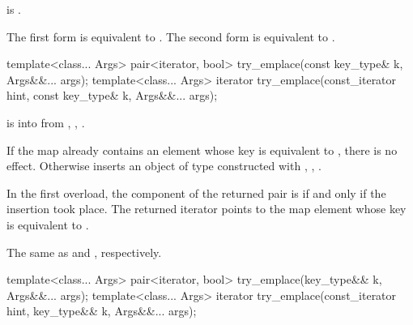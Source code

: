 \begin{itemdescr}
\pnum
\constraints
{} is .

\pnum
\effects
The first form is equivalent to
. The second form is
equivalent to .
\end{itemdescr}

%
\begin{itemdecl}
template<class... Args>
  pair<iterator, bool> try_emplace(const key_type& k, Args&&... args);
template<class... Args>
  iterator try_emplace(const_iterator hint, const key_type& k, Args&&... args);
\end{itemdecl}

\begin{itemdescr}
\pnum
\expects
{} is  into 
from , ,
.

\pnum
\effects
If the map already contains an element
whose key is equivalent to ,
there is no effect.
Otherwise inserts an object of type 
constructed with , ,
.

\pnum
\returns
In the first overload,
the  component of the returned pair is 
if and only if the insertion took place.
The returned iterator points to the map element
whose key is equivalent to .

\pnum
\complexity
The same as  and ,
respectively.
\end{itemdescr}

%
\begin{itemdecl}
template<class... Args>
  pair<iterator, bool> try_emplace(key_type&& k, Args&&... args);
template<class... Args>
  iterator try_emplace(const_iterator hint, key_type&& k, Args&&... args);
\end{itemdecl}

